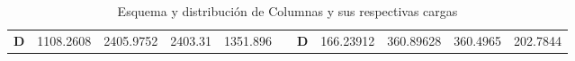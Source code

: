 \documentclass[12pt]{article}
\begin{document}
\begin{table}[H]
{\begin{tabular}{|c|r|r|r|r|r|c|r|r|r|r|}
\cline{1-5}\cline{7-11}    \rowcolor[rgb]{ 1,  .949,  .8} \textbf{D} & \cellcolor[rgb]{ 1,  1,  1}1108.2608 & \cellcolor[rgb]{ 1,  1,  1}2405.9752 & \cellcolor[rgb]{ 1,  1,  1}2403.31 & \cellcolor[rgb]{ 1,  1,  1}1351.896 & \cellcolor[rgb]{ 1,  1,  1} & \textbf{D} & \cellcolor[rgb]{ 1,  1,  1}166.23912 & \cellcolor[rgb]{ 1,  1,  1}360.89628 & \cellcolor[rgb]{ 1,  1,  1}360.4965 & \cellcolor[rgb]{ 1,  1,  1}202.7844 \bigstrut\\
\cline{1-5}\cline{7-11}    \end{tabular}}%
  \caption{Esquema y distribución de Columnas y sus respectivas cargas}
  \label{tab:Cargasa vigas amarre}%
\end{table}%



% 
% 
% 
% 
\end{document}
